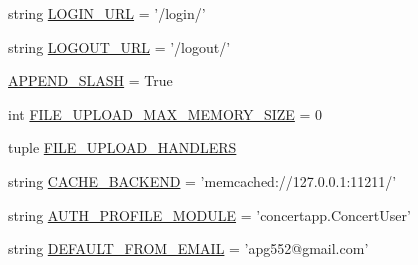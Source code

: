 \begin{DoxyCompactItemize}
\item 
string \hyperlink{namespaceconcertapp_1_1settings_a395e8c4edacb23139ab60f206ac79930}{LOGIN\_\-URL} = '/login/'
\item 
string \hyperlink{namespaceconcertapp_1_1settings_a8f3737759fae0b36514d05db8d388810}{LOGOUT\_\-URL} = '/logout/'
\item 
\hyperlink{namespaceconcertapp_1_1settings_a17b818bd6ddd258a8bf3bc9d9f29ae6e}{APPEND\_\-SLASH} = True
\item 
int \hyperlink{namespaceconcertapp_1_1settings_a950119dc16c0336705f6aac5b0f60063}{FILE\_\-UPLOAD\_\-MAX\_\-MEMORY\_\-SIZE} = 0
\item 
tuple \hyperlink{namespaceconcertapp_1_1settings_a3b26ebbff949231f8ca6960b192e273a}{FILE\_\-UPLOAD\_\-HANDLERS}
\item 
string \hyperlink{namespaceconcertapp_1_1settings_aca003552cce2e329b71193ab95f9d02d}{CACHE\_\-BACKEND} = 'memcached://127.0.0.1:11211/'
\item 
string \hyperlink{namespaceconcertapp_1_1settings_a8c1ac824cf01b178c085f46a12a0b747}{AUTH\_\-PROFILE\_\-MODULE} = 'concertapp.ConcertUser'
\item 
string \hyperlink{namespaceconcertapp_1_1settings_ab4129cc2479cee53fcb11d0048c3572e}{DEFAULT\_\-FROM\_\-EMAIL} = 'apg552@gmail.com'
\end{DoxyCompactItemize}


